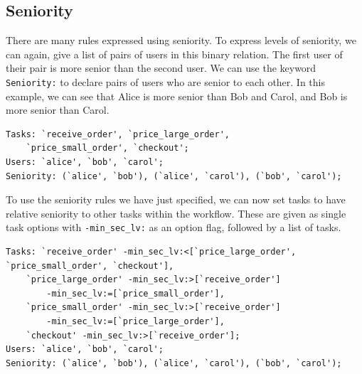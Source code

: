 \documentclass[a4paper]{report}
\begin{document}
\newpage

\subsection{Seniority}
There are many rules expressed using seniority. To express levels of seniority, we can again, give a list of pairs of users in this binary relation. The first user of their pair is more senior than the second user. We can use the keyword \texttt{Seniority:} to declare pairs of users who are senior to each other. In this example, we can see that Alice is more senior than Bob and Carol, and Bob is more senior than Carol.
\begin{lstlisting}[frame=single]
Tasks: `receive_order', `price_large_order', 
	`price_small_order', `checkout'; 
Users: `alice', `bob', `carol';
Seniority: (`alice', `bob'), (`alice', `carol'), (`bob', `carol');
\end{lstlisting} 


To use the seniority rules we have just specified, we can now set tasks to have relative seniority to other tasks within the workflow. These are given as single task options with \texttt{-min\_sec\_lv:} as an option flag, followed by a list of tasks.
\begin{lstlisting}[frame=single]
Tasks: `receive_order' -min_sec_lv:<[`price_large_order', `price_small_order', `checkout'], 
	`price_large_order' -min_sec_lv:>[`receive_order'] 
		-min_sec_lv:=[`price_small_order'], 
	`price_small_order' -min_sec_lv:>[`receive_order'] 
		-min_sec_lv:=[`price_large_order'], 
	`checkout' -min_sec_lv:>[`receive_order']; 
Users: `alice', `bob', `carol'; 
Seniority: (`alice', `bob'), (`alice', `carol'), (`bob', `carol');
\end{lstlisting} 
\end{document}
